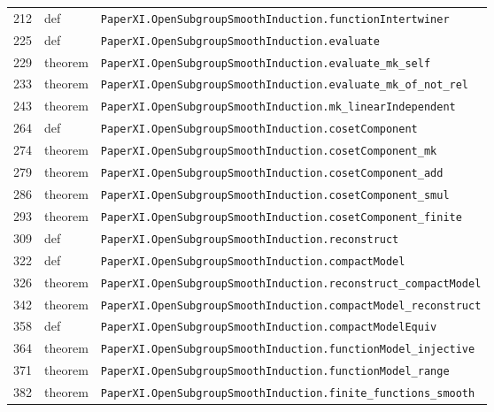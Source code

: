 \documentclass[10pt,oneside]{book}
\begin{document}
\begin{longtable}{@{}p{}p{}p{}@{}}
212&def&\nolinkurl{PaperXI.OpenSubgroupSmoothInduction.functionIntertwiner}\\

225&def&\nolinkurl{PaperXI.OpenSubgroupSmoothInduction.evaluate}\\

229&theorem&\nolinkurl{PaperXI.OpenSubgroupSmoothInduction.evaluate_mk_self}\\

233&theorem&\nolinkurl{PaperXI.OpenSubgroupSmoothInduction.evaluate_mk_of_not_rel}\\

243&theorem&\nolinkurl{PaperXI.OpenSubgroupSmoothInduction.mk_linearIndependent}\\

264&def&\nolinkurl{PaperXI.OpenSubgroupSmoothInduction.cosetComponent}\\

274&theorem&\nolinkurl{PaperXI.OpenSubgroupSmoothInduction.cosetComponent_mk}\\

279&theorem&\nolinkurl{PaperXI.OpenSubgroupSmoothInduction.cosetComponent_add}\\

286&theorem&\nolinkurl{PaperXI.OpenSubgroupSmoothInduction.cosetComponent_smul}\\

293&theorem&\nolinkurl{PaperXI.OpenSubgroupSmoothInduction.cosetComponent_finite}\\

309&def&\nolinkurl{PaperXI.OpenSubgroupSmoothInduction.reconstruct}\\

322&def&\nolinkurl{PaperXI.OpenSubgroupSmoothInduction.compactModel}\\

326&theorem&\nolinkurl{PaperXI.OpenSubgroupSmoothInduction.reconstruct_compactModel}\\

342&theorem&\nolinkurl{PaperXI.OpenSubgroupSmoothInduction.compactModel_reconstruct}\\

358&def&\nolinkurl{PaperXI.OpenSubgroupSmoothInduction.compactModelEquiv}\\

364&theorem&\nolinkurl{PaperXI.OpenSubgroupSmoothInduction.functionModel_injective}\\

371&theorem&\nolinkurl{PaperXI.OpenSubgroupSmoothInduction.functionModel_range}\\

382&theorem&\nolinkurl{PaperXI.OpenSubgroupSmoothInduction.finite_functions_smooth}\\

\bottomrule\end{longtable}
\end{document}
